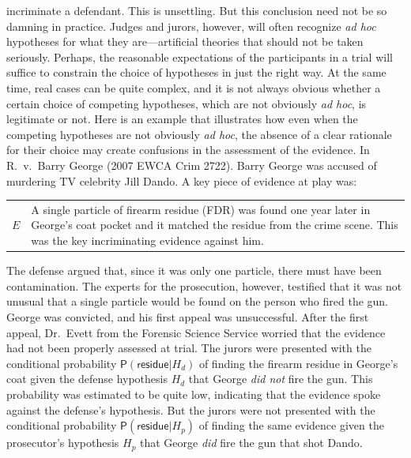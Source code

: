 \documentclass[10pt,dvipsnames,enabledeprecatedfontcommands]{scrartcl}
\newcommand{\pr}[1]{\mathsf{P}(#1)}
\begin{document}
incriminate a defendant. This is unsettling. But this conclusion need
not be so damning in practice. Judges and jurors, however, will often
recognize \textit{ad hoc} hypotheses for what they are---artificial
theories that should not be taken seriously. Perhaps, the reasonable
expectations of the participants in a trial will suffice to constrain
the choice of hypotheses in just the right way. At the same time, real
cases can be quite complex, and it is not always obvious whether a
certain choice of competing hypotheses, which are not obviously
\textit{ad hoc}, is legitimate or not. Here is an example that
illustrates how even when the competing hypotheses are not obviously
\textit{ad hoc}, the absence of a clear rationale for their choice may
create confusions in the assessment of the evidence. In R.~v.~Barry
George (2007 EWCA Crim 2722). Barry George was accused of murdering TV
celebrity Jill Dando. A key piece of evidence at play was: \vspace{2mm}

\begin{center}
\begin{tabular}{lp{12cm}} 
    $E$ &  
    A single particle of firearm  residue (FDR) 
     was found one year later in George's coat pocket and it matched the residue from the crime scene.
     This was the key incriminating evidence against him. 
\end{tabular}
\end{center}

\vspace{2mm} \noindent  The defense argued that, since it was only one
particle, there must have been contamination. The experts for the
prosecution, however, testified that it was not unusual that a single
particle would be found on the person who fired the gun. George was
convicted, and his first appeal was unsuccessful. After the first
appeal, Dr.~Evett from the Forensic Science Service worried that the
evidence had not been properly assessed at trial. The jurors were
presented with the conditional probability
\(\pr{\textsf{residue}\vert H_d}\) of finding the firearm residue in
George's coat given the defense hypothesis \(H_d\) that George
\textit{did not} fire the gun. This probability was estimated to be
quite low, indicating that the evidence spoke against the defense's
hypothesis. But the jurors were not presented with the conditional
probability \(\pr{\textsf{residue}\vert H_p}\) of finding the same
evidence given the prosecutor's hypothesis \(H_p\) that George
\textit{did} fire the gun that shot Dando. \vspace{2mm}
\end{document}
